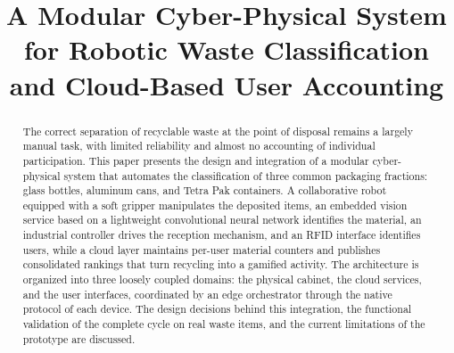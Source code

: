 ﻿\documentclass[conference]{IEEEtran}
\begin{document}
\title{A Modular Cyber-Physical System for Robotic Waste Classification and Cloud-Based User Accounting}

\author{} %

\maketitle

\begin{abstract}
The correct separation of recyclable waste at the point of disposal remains a largely manual task, with limited reliability and almost no accounting of individual participation. This paper presents the design and integration of a modular cyber-physical system that automates the classification of three common packaging fractions: glass bottles, aluminum cans, and Tetra Pak containers. A collaborative robot equipped with a soft gripper manipulates the deposited items, an embedded vision service based on a lightweight convolutional neural network identifies the material, an industrial controller drives the reception mechanism, and an RFID interface identifies users, while a cloud layer maintains per-user material counters and publishes consolidated rankings that turn recycling into a gamified activity. The architecture is organized into three loosely coupled domains: the physical cabinet, the cloud services, and the user interfaces, coordinated by an edge orchestrator through the native protocol of each device. The design decisions behind this integration, the functional validation of the complete cycle on real waste items, and the current limitations of the prototype are discussed.
\end{abstract}
\end{document}
